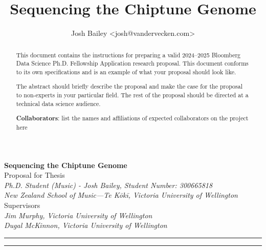\documentclass[10pt]{article}
\author{Josh Bailey <josh@vandervecken.com>}
\title{Sequencing the Chiptune Genome}
\begin{document}
        \begin{center}
          {\Large \textbf{Sequencing the Chiptune Genome}}\\
                \vspace{1em}
                Proposal for Thesis\\
                \vspace{1em}
                \textit{
                Ph.D. Student (Music) - Josh Bailey,
                Student Number: 300665818\\
                  New Zealand School of Music—Te Kōkī,
                  Victoria University of Wellington}\\
                \vspace{1em}
                Supervisors\\
                \vspace{1em}
                \textit{
                  Jim Murphy, Victoria University of Wellington\\
                  Dugal McKinnon, Victoria University of Wellington}\\
        \end{center}

        \begin{center}
                \rule{150mm}{0.2mm}
        \end{center}

        \begin{abstract}

        This document contains the instructions for preparing a valid 2024--2025 Bloomberg Data Science Ph.D. Fellowship Application research proposal. This document conforms to its own specifications and is an example of what your proposal should look like.

        The abstract should briefly describe the proposal and make the case for the proposal to non-experts in your particular field. The rest of the proposal should be directed at a technical data science audience.

        \textbf{Collaborators}: list the names and affiliations of expected collaborators on the project here
        \end{abstract}

        \begin{center}
                \rule{150mm}{0.2mm}
        \end{center}

        \vspace{5mm}
\end{document}

